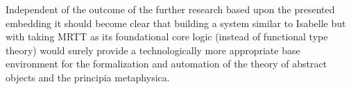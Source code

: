 \begin{isabellebody}
\begin{isamarkuptext}
 Independent of the outcome of the further research based upon the presented embedding it should 
 become clear that building a system similar to Isabelle but with taking MRTT as its foundational 
 core logic (instead of functional type theory) would surely provide
 a technologically more appropriate base environment for the formalization and automation of the 
 theory of abstract objects and the principia metaphysica.%
\end{isamarkuptext}\isamarkuptrue%
%
\isadelimtheory
%
\endisadelimtheory
%
\isatagtheory
%
\endisatagtheory
{\isafoldtheory}%
%
\isadelimtheory
%
\endisadelimtheory
%
\end{isabellebody}%
